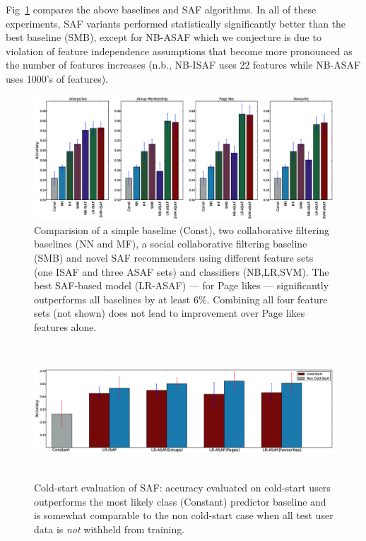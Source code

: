 Fig~\ref{Fig1} compares the above baselines and SAF algorithms.  In
all of these experiments, SAF variants performed statistically
significantly better than the best baseline (SMB), except for NB-ASAF
which we conjecture is due to violation of feature independence
assumptions that become more pronounced as the number of features
increases (n.b., NB-ISAF uses 22 features while NB-ASAF uses 1000's of
features).

\begin{figure}[tbh!]
\hspace{-6mm}\includegraphics[width=190mm]{data/plots/accuracy/accuracyLargeNew.eps}
\vspace{-6mm}
\caption{Comparision of a simple baseline (Const), two collaborative
  filtering baselines (NN and MF), a social collaborative filtering
  baseline (SMB) and novel SAF recommenders using different feature
  sets (one ISAF and three ASAF sets) and classifiers (NB,LR,SVM).
  The best SAF-based model (LR-ASAF) --- for Page likes --- significantly outperforms
  all baselines by at least 6\%.  Combining all four feature sets (not shown)
  does not lead to improvement over Page likes features alone.}
\label{Fig1}
\end{figure}

\begin{figure}[tbh!]
\centering
\includegraphics[width=180mm,height=50mm]{data/plots/new/cold_start.eps}
\vspace{-6mm}
\caption{Cold-start evaluation of SAF: accuracy evaluated on cold-start users 
  outperforms the most likely class (Constant) predictor baseline and is
  somewhat comparable to the non cold-start case when all test user data is \emph{not}
  withheld from training.}
\label{fig:coldstart}
\end{figure}
 

